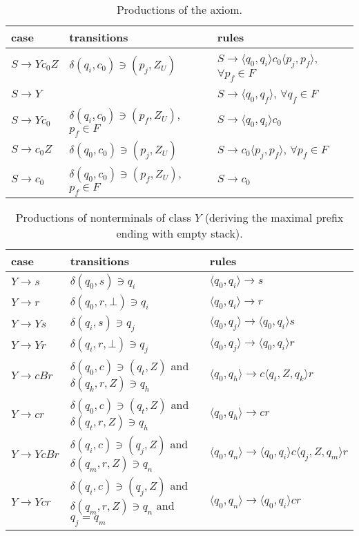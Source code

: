 \documentclass[3p,11pt]{elsarticle}
\begin{document}
\begin{table}[h!]
\caption{\label{productionsS}Productions of the axiom. }
\renewcommand{\arraystretch}{1.3}
\begin{tabular}{l|p{5cm}|p{6cm}}
  case & transitions  & rules \\
  \hline
 $S\to Yc_0 Z$ & $\delta(q_i, c_0)\ni(p_j, Z_U)$ &   $S \to \langle q_0,q_i\rangle c_0 \langle p_j, p_f\rangle$, $\forall p_f \in F$ \\

   $S\to Y$   &   &  $S \to \langle q_0,q_f\rangle$, $\forall q_f \in F$  \\

    $S\to Y c_0 $   & $\delta(q_i, c_0)\ni(p_f, Z_U)$, $p_f \in F$&   $S \to \langle q_0,q_i\rangle c_0$ \\

    $S\to  c_0 Z$    & $\delta(q_0, c_0)\ni(p_j, Z_U)$ &  $S \to  c_0 \langle p_j, p_f\rangle$, $\forall p_f \in F$ \\

   $S\to  c_0$   & $\delta(q_0, c_0)\ni(p_f, Z_U)$, $p_f \in F$ &  $S \to  c_0$\\
  \hline
\end{tabular}
\end{table}
\begin{table}[h!]
\caption{\label{productionsY}Productions of nonterminals of class $Y$ (deriving the maximal prefix ending with empty stack). }
\renewcommand{\arraystretch}{1.3}
\begin{tabular}{l|p{6cm}|l}
  case & transitions  & rules \\
  \hline
 $Y\to s$ & $\delta(q_0, s)\ni q_i$ &   $\langle  q_0,q_i\rangle\to  s$  \\

 $Y\to r$    & $\delta(q_0, r, \bot)\ni q_i$ &  $\langle q_0,q_i\rangle\to  r$ \\

 $Y\to Y s$    & $\delta(q_i, s)\ni q_j$ &  $\langle q_0,q_j\rangle\to \langle q_0,q_i\rangle s$ \\

 $Y\to Y r$    & $\delta(q_i, r, \bot)\ni q_j$ & $\langle q_0,q_j\rangle\to \langle q_0,q_i\rangle r$\\

 $Y\to c B r$   & $\delta(q_0, c)\ni (q_t, Z)$ and  $\delta(q_k, r, Z)\ni q_h $ & $\langle q_0, q_h\rangle\to c \langle q_t, Z, q_k\rangle r$\\

$Y\to c r$    & $\delta(q_0, c)\ni (q_t, Z)$ and  $\delta(q_t, r, Z)\ni q_h $ & $\langle q_0, q_h\rangle\to c r$\\

 $Y\to Y c B r$ & $\delta(q_i, c)\ni (q_j, Z)$ and $\delta(q_m, r, Z)\ni q_n$ & $\langle q_0,q_n \rangle \to \langle q_0,q_i \rangle c \langle q_j, Z, q_m\rangle r$\\

 $Y\to Y c  r$  & $\delta(q_i, c)\ni (q_j, Z)$ and $\delta(q_m, r, Z)\ni q_n$ and $q_j=q_m$ & $\langle q_0,q_n \rangle \to \langle q_0,q_i \rangle c  r $ \\

  \hline
\end{tabular}
\end{table}
\end{document}
